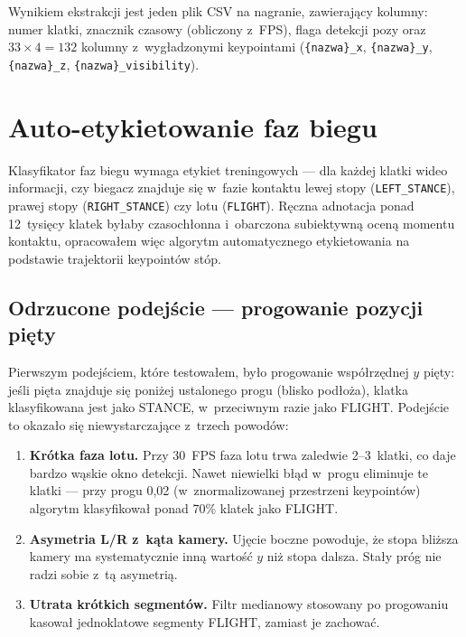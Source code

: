 Wynikiem ekstrakcji jest jeden plik CSV na nagranie, zawierający kolumny: numer klatki, znacznik czasowy (obliczony z~FPS), flaga detekcji pozy oraz $33 \times 4 = 132$ kolumny z~wygładzonymi keypointami (\texttt{\{nazwa\}\_x}, \texttt{\{nazwa\}\_y}, \texttt{\{nazwa\}\_z}, \texttt{\{nazwa\}\_visibility}).

\section{Auto-etykietowanie faz biegu}
\label{sec:auto-labeling}

Klasyfikator faz biegu wymaga etykiet treningowych --- dla każdej klatki wideo informacji, czy biegacz znajduje się w~fazie kontaktu lewej stopy (\texttt{LEFT\_STANCE}), prawej stopy (\texttt{RIGHT\_STANCE}) czy lotu (\texttt{FLIGHT}). Ręczna adnotacja ponad 12~tysięcy klatek byłaby czasochłonna i~obarczona subiektywną oceną momentu kontaktu, opracowałem więc algorytm automatycznego etykietowania na podstawie trajektorii keypointów stóp.

\subsection{Odrzucone podejście --- progowanie pozycji pięty}
\label{sec:labeling-rejected}

Pierwszym podejściem, które testowałem, było progowanie współrzędnej $y$ pięty: jeśli pięta znajduje się poniżej ustalonego progu (blisko podłoża), klatka klasyfikowana jest jako STANCE, w~przeciwnym razie jako FLIGHT. Podejście to okazało się niewystarczające z~trzech powodów:

\begin{enumerate}
    \item \textbf{Krótka faza lotu.} Przy 30~FPS faza lotu trwa zaledwie 2--3~klatki, co daje bardzo wąskie okno detekcji. Nawet niewielki błąd w~progu eliminuje te klatki --- przy progu 0{,}02 (w~znormalizowanej przestrzeni keypointów) algorytm klasyfikował ponad 70\% klatek jako FLIGHT.
    \item \textbf{Asymetria L/R z~kąta kamery.} Ujęcie boczne powoduje, że stopa bliższa kamery ma systematycznie inną wartość $y$ niż stopa dalsza. Stały próg nie radzi sobie z~tą asymetrią.
    \item \textbf{Utrata krótkich segmentów.} Filtr medianowy stosowany po progowaniu kasował jednoklatowe segmenty FLIGHT, zamiast je zachować.
\end{enumerate}

